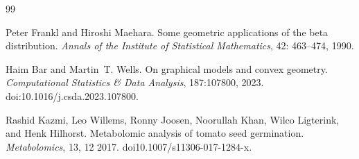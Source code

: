 \documentclass[a4paper,10pt]{article}
\begin{document}


\begin{thebibliography}{99}

Peter Frankl and Hiroshi Maehara.
\newblock Some geometric applications of the beta distribution.
\newblock \emph{Annals of the Institute of Statistical Mathematics},
  42: 463--474, 1990.

Haim Bar and Martin~T. Wells.
\newblock On graphical models and convex geometry.
\newblock \emph{Computational Statistics \& Data Analysis}, 187:107800, 2023.
\newblock doi:10.1016/j.csda.2023.107800.

Rashid Kazmi, Leo Willems, Ronny Joosen, Noorullah Khan, Wilco Ligterink, and
  Henk Hilhorst.
\newblock Metabolomic analysis of tomato seed germination.
\newblock \emph{Metabolomics}, 13, 12 2017.
\newblock doi{10.1007/s11306-017-1284-x}.

\end{thebibliography}
\end{document}
